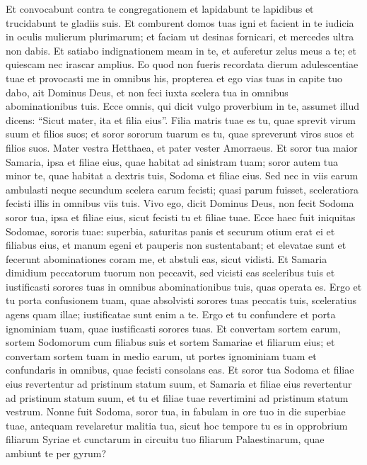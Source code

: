 \begin{biblechapter}
\begin{biblechapter}
\begin{biblechapter}
\begin{biblechapter}
\begin{biblechapter}
\begin{biblechapter}
\begin{biblechapter}
\begin{biblechapter}
\begin{biblechapter}
\begin{biblechapter}
\begin{biblechapter}
\begin{biblechapter}
\begin{biblechapter}
\begin{biblechapter}
\begin{biblechapter}
\begin{biblechapter}
\verse Et convocabunt contra te congregationem et lapidabunt te lapidibus et trucidabunt te gladiis suis. 
\verse Et comburent domos tuas igni et facient in te iudicia in oculis mulierum plurimarum; et faciam ut desinas fornicari, et mercedes ultra non dabis. 
\verse Et satiabo indignationem meam in te, et auferetur zelus meus a te; et quiescam nec irascar amplius. 
\verse Eo quod non fueris recordata dierum adulescentiae tuae et provocasti me in omnibus his, propterea et ego vias tuas in capite tuo dabo, ait Dominus Deus, et non feci iuxta scelera tua in omnibus abominationibus tuis.
 \verse Ecce omnis, qui dicit vulgo proverbium in te, assumet illud dicens: “Sicut mater, ita et filia eius”. 
\verse Filia matris tuae es tu, quae sprevit virum suum et filios suos; et soror sororum tuarum es tu, quae spreverunt viros suos et filios suos. Mater vestra Hetthaea, et pater vester Amorraeus. 
\verse Et soror tua maior Samaria, ipsa et filiae eius, quae habitat ad sinistram tuam; soror autem tua minor te, quae habitat a dextris tuis, Sodoma et filiae eius. 
 \verse Sed nec in viis earum ambulasti neque secundum scelera earum fecisti; quasi parum fuisset, sceleratiora fecisti illis in omnibus viis tuis. 
\verse Vivo ego, dicit Dominus Deus, non fecit Sodoma soror tua, ipsa et filiae eius, sicut fecisti tu et filiae tuae. 
\verse Ecce haec fuit iniquitas Sodomae, sororis tuae: superbia, saturitas panis et securum otium erat ei et filiabus eius, et manum egeni et pauperis non sustentabant; 
\verse et elevatae sunt et fecerunt abominationes coram me, et abstuli eas, sicut vidisti. 
\verse Et Samaria dimidium peccatorum tuorum non peccavit, sed vicisti eas sceleribus tuis et iustificasti sorores tuas in omnibus abominationibus tuis, quas operata es.
 \verse Ergo et tu porta confusionem tuam, quae absolvisti sorores tuas peccatis tuis, sceleratius agens quam illae; iustificatae sunt enim a te. Ergo et tu confundere et porta ignominiam tuam, quae iustificasti sorores tuas. 
\verse Et convertam sortem earum, sortem Sodomorum cum filiabus suis et sortem Samariae et filiarum eius; et convertam sortem tuam in medio earum, 
\verse ut portes ignominiam tuam et confundaris in omnibus, quae fecisti consolans eas. 
\verse Et soror tua Sodoma et filiae eius revertentur ad pristinum statum suum, et Samaria et filiae eius revertentur ad pristinum statum suum, et tu et filiae tuae revertimini ad pristinum statum vestrum. 
\verse Nonne fuit Sodoma, soror tua, in fabulam in ore tuo in die superbiae tuae, 
\verse antequam revelaretur malitia tua, sicut hoc tempore tu es in opprobrium filiarum Syriae et cunctarum in circuitu tuo filiarum Palaestinarum, quae ambiunt te per gyrum? 

\end{biblechapter}
\end{biblechapter}
\end{biblechapter}
\end{biblechapter}
\end{biblechapter}
\end{biblechapter}
\end{biblechapter}
\end{biblechapter}
\end{biblechapter}
\end{biblechapter}
\end{biblechapter}
\end{biblechapter}
\end{biblechapter}
\end{biblechapter}
\end{biblechapter}
\end{biblechapter}

